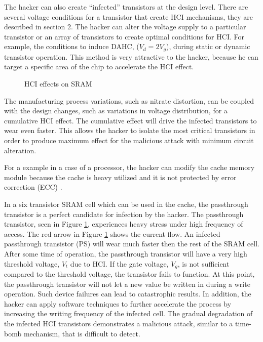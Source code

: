 \documentclass[12pt,conference]{IEEEtran}
\begin{document}
 
The hacker can also create ``infected'' transistors at the design level.  There are several voltage conditions for a transistor that create HCI mechanisms, they are described in section 2.  The hacker can alter the voltage supply to a particular transistor or an array of transistors to create optimal conditions for HCI.  For example, the conditions to induce DAHC, ($V_d=2V_g$), during static or dynamic transistor operation.  This method is very attractive to the hacker, because he can target a specific area of the chip to accelerate the HCI effect.  


\begin{figure}[htp]
\caption{HCI effects on SRAM}
\label{figHCI4}
\end{figure}


The manufacturing process variations, such as nitrate distortion, can be coupled with the design changes, such as variations in voltage distribution, for a cumulative HCI effect.  The cumulative effect will drive the infected transistors to wear even faster.  This allows the hacker to isolate the most critical transistors in order to produce maximum effect for the malicious attack with minimum circuit alteration.  

For a example in a case of a processor, the hacker can modify the cache memory module because the cache is heavy utilized and it is not protected by error correction (ECC) \cite{CACHE07A}.


In a six transistor SRAM cell which can be used in the cache, the passthrough transistor is a perfect candidate for infection by the hacker.  The passthrough transistor, seen in Figure \ref{figHCI4}, experiences heavy stress under high frequency of access.  The red arrow in Figure \ref{figHCI4} shows the current flow. An infected passthrough transistor (PS) will wear much faster then the rest of the SRAM cell.  After some time of operation, the passthrough transistor will have a very high threshold voltage, $V_t$ due to HCI.  If the gate voltage, $V_g$, is not sufficient compared to the threshold voltage, the transistor fails to function.  At this point, the passthrough transistor will not let a new value be written in during a write operation.   Such device failures can lead to catastrophic results. In addition, the hacker can apply software techniques to further accelerate the process by increasing the writing frequency of the infected cell.  The gradual degradation of the infected HCI transistors demonstrates a malicious attack, similar to  a time-bomb mechanism, that is difficult to detect. 
\end{document}
